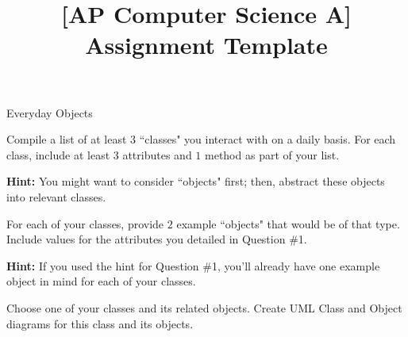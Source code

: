 \documentclass[11pt]{exam}
\title{[AP Computer Science A] Assignment Template}
\newcommand{\AssignmentTitle}{Everyday Objects}
\newcommand{\ColorQuestion}[2]{\renewcommand{\questionlabel}{\colorbox{#1}{\color{white}\thequestion}\hfill}\question #2}
\newcommand{\YellowQuestion}[1]{\ColorQuestion{Goldenrod}{#1}}
\begin{document}
	\begin{center}
		\Large\AssignmentTitle
	\end{center}

	\begin{questions}
		\YellowQuestion Compile a list of at least $3$ ``classes" you interact with on a daily basis. For each class, include at least $3$ attributes and $1$ method as part of your list.

        {\small\textbf{Hint:} You might want to consider ``objects" first; then, abstract these objects into relevant classes.}

        \vspace{1cm}

        \YellowQuestion For each of your classes, provide $2$ example ``objects" that would be of that type. Include values for the attributes you detailed in Question \#1.

        {\small\textbf{Hint:} If you used the hint for Question \#1, you'll already have one example object in mind for each of your classes.}
        
        \vspace{1cm}

        \YellowQuestion Choose one of your classes and its related objects. Create UML Class and Object diagrams for this class and its objects.
	\end{questions}
\end{document}
